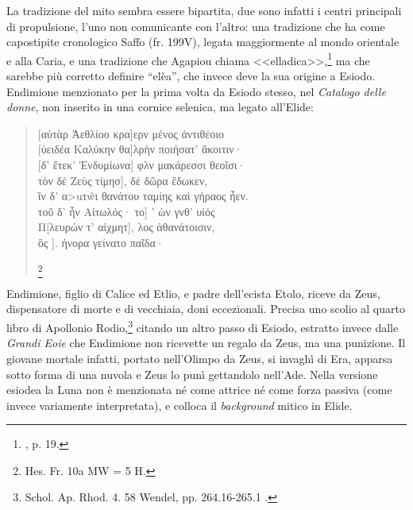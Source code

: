 \documentclass[12pt,a4paper,openright, oneside]{book}
\begin{document}
La tradizione del mito sembra essere bipartita, due sono infatti i centri principali di propulsione, l'uno non comunicante con l'altro: una tradizione che ha come capostipite cronologico Saffo (fr. 199V), legata maggiormente al mondo orientale e alla Caria, e una tradizione che Agapiou chiama <<elladica>>,\footnote{\cite{Agapiou}, p. 19.} ma che sarebbe più corretto definire ``elèa'', che invece deve la sua origine a Esiodo.
Endimione menzionato per la prima volta da Esiodo stesso, nel \textit{Catalogo delle donne}, non inserito in una cornice selenica, ma legato all'Elide:
\begin{quote}\begin{singlespace}
\footnotesize{
\begin{otherlanguage}{greek} 
[αὐτὰρ Ἀεθλίοο κρα]ερν μένος ἀντιθέοιο\\
[ὐειδέα Καλύκην θα]λρὴν ποιήσατ’ ἄκοιτιν·\\
 [δ’ ἔτεκ’ Ἐνδυμίωνα] φλν μακάρεσσι θεοῖσι·\\
\lbrk τὸν δὲ Ζεὺς τίμησ],  δὲ δῶρα ἔδωκεν,\\
ἳν δ’ α>uτ\~wι θανάτου ταμίης καὶ γήραος ἦεν.\\
\lbrk τοῦ δ’ ἦν Αἰτωλός· το] ’  ὼν γνθ’ υἱός\\
Π[λευρών τ’ αἰχμητ], λος ἀθανάτοισιν,\\
\lbrk \hspace{2cm}ὃς           ]. ήνορα γείνατο παῖδα·\end{otherlanguage}}\footnote{Hes. Fr. 10a MW = 5 H.  \nocite{EsiodoHirsch} \nocite{EsiodoWest}}
\end{singlespace}\end{quote}

Endimione, figlio di Calice ed Etlio, e padre dell'ecista Etolo, riceve da Zeus, dispensatore di morte e di vecchiaia, doni eccezionali. Precisa uno scolio al quarto libro di Apollonio Rodio,\footnote{Schol. Ap. Rhod. 4. 58 Wendel, pp. 264.16-265.1 \nocite{WendelAp}.} citando un  altro passo di Esiodo, estratto invece dalle \textit{Grandi Eoie} che Endimione non ricevette un regalo da Zeus, ma una punizione. Il giovane mortale infatti, portato nell'Olimpo da Zeus, si invaghì di Era, apparsa sotto forma di una nuvola e  Zeus lo punì gettandolo nell'Ade. Nella versione esiodea la Luna non è menzionata né come attrice né come forza passiva (come invece variamente interpretata), e colloca il \textit{background} mitico in Elide.
\end{document}
